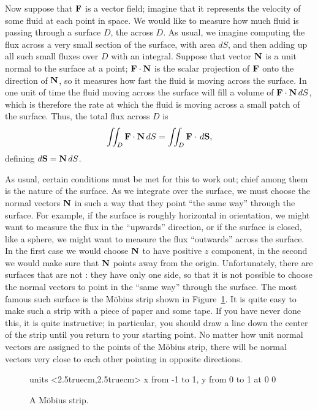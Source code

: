 Now suppose that ${\bf F}$ is a vector field; imagine that it
represents the velocity of some fluid at each point in space. We would
like to measure how much fluid is passing through a surface $D$, the
 across $D$. As usual, we imagine computing
the flux across a very small section of the surface, with area $dS$,
and then adding up all such small fluxes over $D$ with an
integral. Suppose that vector $\bf N$ is a unit normal to the surface
at a point; ${\bf F}\cdot{\bf N}$ is the scalar projection of $\bf F$
onto the direction of $\bf N$, so it measures how fast the fluid is
moving across the surface. In one unit of time the fluid moving across
the surface will fill a volume of ${\bf F}\cdot{\bf N}\,dS$, which is
therefore the rate at which the fluid is moving across a small patch
of the surface. Thus, the total flux across $D$ is
$$\iint_{D} {\bf F}\cdot{\bf N}\,dS=\iint_{D} {\bf F}\cdot\,d{\bf S},$$
defining $d{\bf S}={\bf N}\,dS$.

As usual, certain conditions must be met for this to work out; chief
among them is the nature of the surface. As we integrate over the
surface, we must choose the normal vectors $\bf N$ in such a way that
they point ``the same way'' through the surface. For example, if the
surface is roughly horizontal in orientation, we might want to measure
the flux in the ``upwards'' direction, or if the surface is closed,
like a sphere, we might want to measure the flux ``outwards'' across
the surface. In the first case we would choose $\bf N$ to have
positive $z$ component, in the second we would make sure that $\bf N$
points away from the origin. Unfortunately, there are surfaces that
are not : they have
only one side, so that it is not possible to choose the normal vectors
to point in the ``same way'' through the surface. The most famous such
surface is the M\"obius strip shown in Figure~\ref{fig:moebius}. It
is quite easy to make such a strip with a piece of paper and some
tape. If you have never done this, it is quite instructive; in
particular, you should draw a line down the center of the strip until
you return to your starting point. No matter how unit normal vectors
are assigned to the points of the M\"obius strip, there will be normal
vectors very close to each other pointing in opposite directions.

\begin{figure}[H]
\centerline{
\vbox{\beginpicture
\normalgraphs
\setcoordinatesystem units <2.5truecm,2.5truecm>
\setplotarea x from -1 to 1, y from 0 to 1
 at 0 0
\endpicture}}
\caption{A M\"obius strip. \label{fig:moebius}}
\end{figure}

